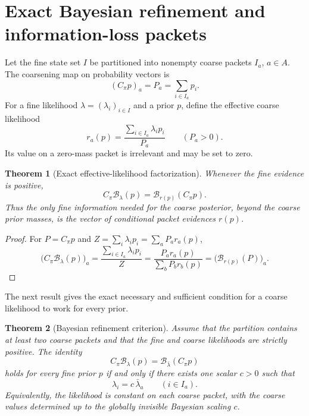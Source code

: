 \documentclass[11pt]{article}
\newtheorem{theorem}{Theorem}[section]
\theoremstyle{definition}
\theoremstyle{remark}
\newcommand{\cB}{\mathcal B}
\begin{document}
\section{Exact Bayesian refinement and information-loss packets}

Let the fine state set $I$ be partitioned into nonempty coarse packets $I_a$, $a\in A$.  The coarsening map on probability vectors is
\[
(C_\pi p)_a=P_a=\sum_{i\in I_a}p_i.
\]
For a fine likelihood $\lambda=(\lambda_i)_{i\in I}$ and a prior $p$, define the effective coarse likelihood
\[
r_a(p)
=
\frac{\sum_{i\in I_a}\lambda_i p_i}{P_a}
\qquad(P_a>0).
\]
Its value on a zero-mass packet is irrelevant and may be set to zero.

\begin{theorem}[Exact effective-likelihood factorization]
Whenever the fine evidence is positive,
\[
\boxed{
C_\pi\cB_\lambda(p)
=
\cB_{r(p)}(C_\pi p).}
\]
Thus the only fine information needed for the coarse posterior, beyond the coarse prior masses, is the vector of conditional packet evidences $r(p)$.
\end{theorem}

\begin{proof}
For $P=C_\pi p$ and $Z=\sum_i\lambda_ip_i=\sum_aP_ar_a(p)$,
\[
\bigl(C_\pi\cB_\lambda(p)\bigr)_a
=
\frac{\sum_{i\in I_a}\lambda_ip_i}{Z}
=
\frac{P_ar_a(p)}{\sum_bP_br_b(p)}
=
\bigl(\cB_{r(p)}(P)\bigr)_a.
\]
\end{proof}

The next result gives the exact necessary and sufficient condition for a coarse likelihood to work for every prior.

\begin{theorem}[Bayesian refinement criterion]
Assume that the partition contains at least two coarse packets and that the fine and coarse likelihoods are strictly positive.  The identity
\[
\boxed{
C_\pi\cB_\lambda(p)
=
\cB_{\bar\lambda}(C_\pi p)}
\]
holds for every fine prior $p$ if and only if there exists one scalar $c>0$ such that
\[
\boxed{
\lambda_i=c\,\bar\lambda_a
\qquad(i\in I_a).}
\]
Equivalently, the likelihood is constant on each coarse packet, with the coarse values determined up to the globally invisible Bayesian scaling $c$.
\end{theorem}
\end{document}
